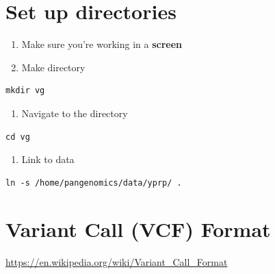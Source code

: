 \documentclass[
]{book}
\providecommand{\tightlist}{%
  \setlength{\itemsep}{0pt}\setlength{\parskip}{0pt}}
\begin{document}
\hypertarget{set-up-directories}{%
\section{Set up directories}\label{set-up-directories}}

\begin{enumerate}
\def\labelenumi{\arabic{enumi}.}
\tightlist
\item
  Make sure you're working in a \textbf{screen}
\item
  Make directory
\end{enumerate}

\begin{verbatim}
mkdir vg
\end{verbatim}

\begin{enumerate}
\def\labelenumi{\arabic{enumi}.}
\setcounter{enumi}{2}
\tightlist
\item
  Navigate to the directory
\end{enumerate}

\begin{verbatim}
cd vg
\end{verbatim}

\begin{enumerate}
\def\labelenumi{\arabic{enumi}.}
\setcounter{enumi}{3}
\tightlist
\item
  Link to data
\end{enumerate}

\begin{verbatim}
ln -s /home/pangenomics/data/yprp/ .
\end{verbatim}

\hypertarget{variant-call-vcf-format}{%
\section{Variant Call (VCF) Format}\label{variant-call-vcf-format}}

\url{https://en.wikipedia.org/wiki/Variant_Call_Format}
\end{document}
